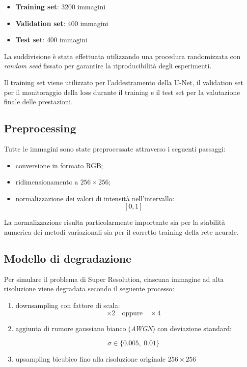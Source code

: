\documentclass{article}
\begin{document}
\begin{itemize}
    \item \textbf{Training set}: 3200 immagini
    \item \textbf{Validation set}: 400 immagini
    \item \textbf{Test set}: 400 immagini
\end{itemize}

La suddivisione è stata effettuata utilizzando una procedura randomizzata con \textit{random seed} fissato per garantire la riproducibilità degli esperimenti.

Il training set viene utilizzato per l’addestramento della U-Net, il validation set per il monitoraggio della loss durante il training e il test set per la valutazione finale delle prestazioni.

\subsection{Preprocessing}

Tutte le immagini sono state preprocessate attraverso i seguenti passaggi:

\begin{itemize}
    \item conversione in formato RGB;
    \item ridimensionamento a \(256 \times 256\);
    \item normalizzazione dei valori di intensità nell’intervallo:
\[
[0,1]
\]
\end{itemize}

La normalizzazione risulta particolarmente importante sia per la stabilità numerica dei metodi variazionali sia per il corretto training della rete neurale.

\subsection{Modello di degradazione}

Per simulare il problema di Super Resolution, ciascuna immagine ad alta risoluzione viene degradata secondo il seguente processo:

\begin{enumerate}
    \item downsampling con fattore di scala:
\[
\times 2
\quad \text{oppure} \quad
\times 4
\]

    \item aggiunta di rumore gaussiano bianco (\textit{AWGN}) con deviazione standard:

\[
\sigma
\in
\{0.005,\; 0.01\}
\]

    \item upsampling bicubico fino alla risoluzione originale \(256 \times 256\)
\end{enumerate}
\end{document}

